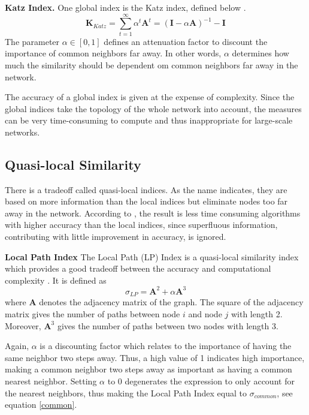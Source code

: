 \textbf{Katz Index.} One global index is the Katz index, defined below \citep{fouss2016algorithms}.
\begin{equation}
    \textbf{K}_{Katz}=\sum_{t=1}^{\infty} \alpha^t \textbf{A}^t = (\textbf{I}-\alpha \textbf{A})^{-1}-\textbf{I}
\end{equation}
The parameter $\alpha \in [0,1]$ defines an attenuation factor to discount the importance of common neighbors far away. In other words, $\alpha$ determines how much the similarity should be dependent om common neighbors far away in the network.

The accuracy of a global index is given at the expense of complexity. Since the global indices take the topology of the whole network into account, the measures can be very time-consuming to compute and thus inappropriate for large-scale networks. 

\subsection{Quasi-local Similarity}
There is a tradeoff called quasi-local indices. As the name indicates, they are based on more information than the local indices but eliminate nodes too far away in the network. According to \citet{lu2011}, the result is less time consuming algorithms with higher accuracy than the local indices, since superfluous information, contributing with little improvement in accuracy, is ignored.

\textbf{Local Path Index} The Local Path (LP) Index is a quasi-local similarity index which provides a good tradeoff between the accuracy and computational complexity \citep{lu2011}. It is defined as 
\begin{equation}
    \label{lp}
    \sigma_{LP} = \textbf{A}^2+\alpha \textbf{A}^3
\end{equation}
where $\textbf{A}$ denotes the adjacency matrix of the graph. The square of the adjacency matrix gives the number of paths between node $i$ and node $j$ with length 2. Moreover, $\textbf{A}^3$ gives the number of paths between two nodes with length 3. 

Again, $\alpha$ is a discounting factor which relates to the importance of having the same neighbor two steps away. Thus, a high value of 1 indicates high importance, making a common neighbor two steps away as important as having a common nearest neighbor. Setting $\alpha$ to 0 degenerates the expression to only account for the nearest neighbors, thus making the Local Path Index equal to $\sigma_{common}$, see equation \eqref{common}.

